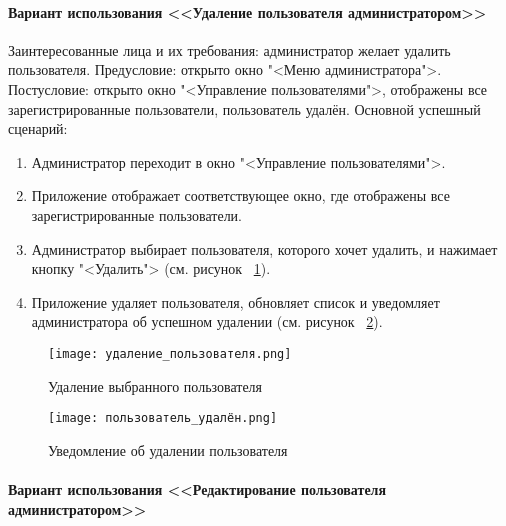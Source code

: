 \paragraph{Вариант использования <<Удаление пользователя администратором>>}

Заинтересованные лица и их требования: администратор желает удалить пользователя.
\newline Предусловие: открыто окно "<Меню администратора">.
\newline Постусловие: открыто окно "<Управление пользователями">, отображены все зарегистрированные пользователи, пользователь удалён.
\newline Основной успешный сценарий:
\begin{enumerate}
	\item Администратор переходит в окно "<Управление пользователями">.
	\item Приложение отображает соответствующее окно, где отображены все зарегистрированные пользователи.
	\item Администратор выбирает пользователя, которого хочет удалить, и нажимает кнопку "<Удалить"> (см. рисунок ~\ref{deleting_user:image}).
	\item Приложение удаляет пользователя, обновляет список и уведомляет администратора об успешном удалении (см. рисунок ~\ref{user_deleted_notif:image}).
\end{enumerate}

\begin{figure}[H]
	\centering
	\texttt{[image: удаление\_пользователя.png]}
	\caption{Удаление выбранного пользователя}
	\label{deleting_user:image}
\end{figure}
\begin{figure}[H]
	\centering
	\texttt{[image: пользователь\_удалён.png]}
	\caption{Уведомление об удалении пользователя}
	\label{user_deleted_notif:image}
\end{figure}

\paragraph{Вариант использования <<Редактирование пользователя администратором>>}

